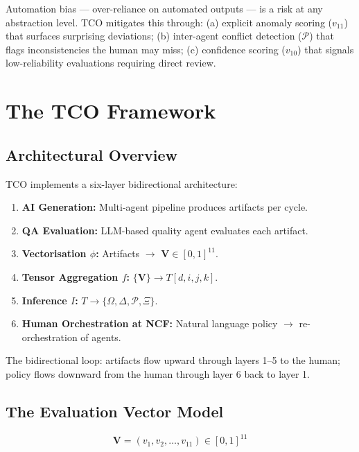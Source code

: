 \documentclass[manuscript,review,anonymous]{acmart}
\begin{document}
Automation bias \cite{parasuraman2010,kucking2024} --- over-reliance on automated
outputs --- is a risk at any abstraction level. TCO mitigates this through:
(a) explicit anomaly scoring ($v_{11}$) that surfaces surprising deviations;
(b) inter-agent conflict detection ($\mathcal{P}$) that flags inconsistencies the
human may miss;
(c) confidence scoring ($v_{10}$) that signals low-reliability evaluations requiring
direct review.

\section{The TCO Framework}

\subsection{Architectural Overview}

TCO implements a six-layer bidirectional architecture:

\begin{enumerate}
  \item \textbf{AI Generation:} Multi-agent pipeline produces artifacts per cycle.
  \item \textbf{QA Evaluation:} LLM-based quality agent evaluates each artifact.
  \item \textbf{Vectorisation $\phi$:} Artifacts $\rightarrow$ $\mathbf{V} \in [0,1]^{11}$.
  \item \textbf{Tensor Aggregation $f$:} $\{\mathbf{V}\} \rightarrow T[d,i,j,k]$.
  \item \textbf{Inference $I$:} $T \rightarrow \{\Omega, \Delta, \mathcal{P}, \Xi\}$.
  \item \textbf{Human Orchestration at NCF:} Natural language policy $\rightarrow$
    re-orchestration of agents.
\end{enumerate}

The bidirectional loop: artifacts flow upward through layers 1--5 to the human;
policy flows downward from the human through layer 6 back to layer 1.

\subsection{The Evaluation Vector Model}

\begin{equation}
  \mathbf{V} = (v_1, v_2, \ldots, v_{11}) \in [0,1]^{11}
\end{equation}
\end{document}
